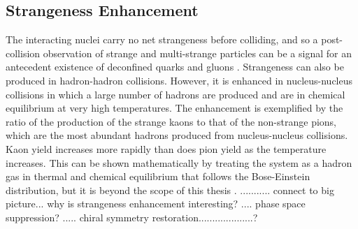 \subsection{Strangeness Enhancement}
The interacting nuclei carry no net strangeness before colliding, and so a post-collision observation of strange and multi-strange particles can be a signal for an antecedent existence of deconfined quarks and gluons \cite{1742-6596-455-1-012005}. Strangeness can also be produced in hadron-hadron collisions. However, it is enhanced in nucleus-nucleus collisions in which a large number of hadrons are produced and are in chemical equilibrium at very high temperatures. The enhancement is exemplified by the ratio of the production of the strange kaons to that of the non-strange pions, which are the most abundant hadrons produced from nucleus-nucleus collisions. Kaon yield increases more rapidly than does pion yield as the temperature increases. This can be shown mathematically by treating the system as a hadron gas in thermal and chemical equilibrium that follows the Bose-Einstein distribution, but it is beyond the scope of this thesis \cite{wong1994introduction}. ........... connect to big picture... why is strangeness enhancement interesting? .... phase space suppression? ..... chiral symmetry restoration....................?


